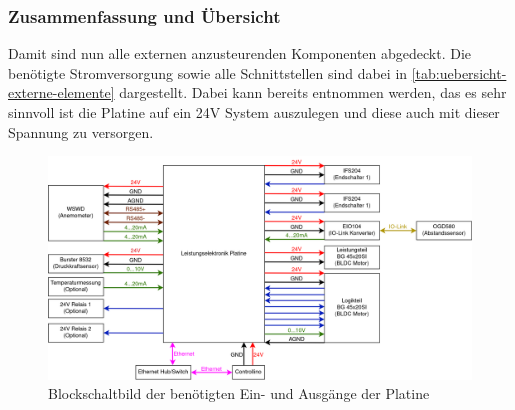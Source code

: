 \subsubsection{Zusammenfassung und Übersicht}
Damit sind nun alle externen anzusteurenden Komponenten abgedeckt. Die benötigte Stromversorgung sowie alle Schnittstellen sind dabei in \autoref{tab:uebersicht-externe-elemente} dargestellt. Dabei kann bereits entnommen werden, das es sehr sinnvoll ist die Platine auf ein 24V System auszulegen und diese auch mit dieser Spannung zu versorgen.
\begin{figure}[H]
	\centering
	\includegraphics[width=1.0\textwidth]{images/System/Systemaufbau.drawio.png}
	\caption{Blockschaltbild der benötigten Ein- und Ausgänge der Platine}
	\label{fig:System_Aufbau}
\end{figure}
